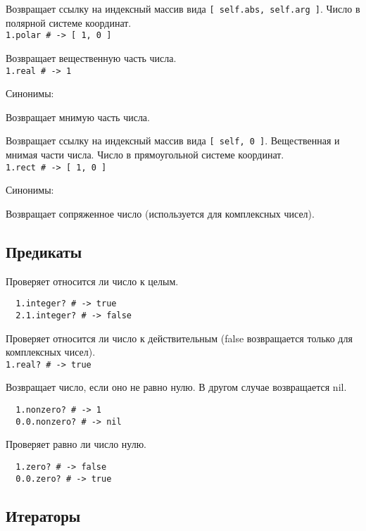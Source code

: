 \begin{methodlist}
  Возвращает ссылку на индексный массив вида \verb![ self.abs, self.arg ]!. Число в полярной системе координат.
  \\\verb!1.polar # -> [ 1, 0 ]!

  Возвращает вещественную часть числа.
  \\\verb!1.real # -> 1!

  Синонимы: 

  Возвращает мнимую часть числа.

  Возвращает ссылку на индексный массив вида \verb![ self, 0 ]!. Вещественная и мнимая части числа. Число в прямоугольной системе координат.
  \\\verb!1.rect # -> [ 1, 0 ]!

  Синонимы: 

  Возвращает сопряженное число (используется для комплексных чисел).
\end{methodlist}

\subsection*{Предикаты}

\begin{methodlist}
  Проверяет относится ли число к целым.
  \begin{verbatim}
  1.integer? # -> true
  2.1.integer? # -> false
  \end{verbatim}

  Проверяет относится ли число к действительным (false возвращается только для комплексных чисел).
  \\\verb!1.real? # -> true!

  Возвращает число, если оно не равно нулю. В другом случае возвращается nil.
  \begin{verbatim}
  1.nonzero? # -> 1
  0.0.nonzero? # -> nil
  \end{verbatim}

  Проверяет равно ли число нулю.
  \begin{verbatim}
  1.zero? # -> false
  0.0.zero? # -> true
  \end{verbatim}
\end{methodlist}

\subsection*{Итераторы}

